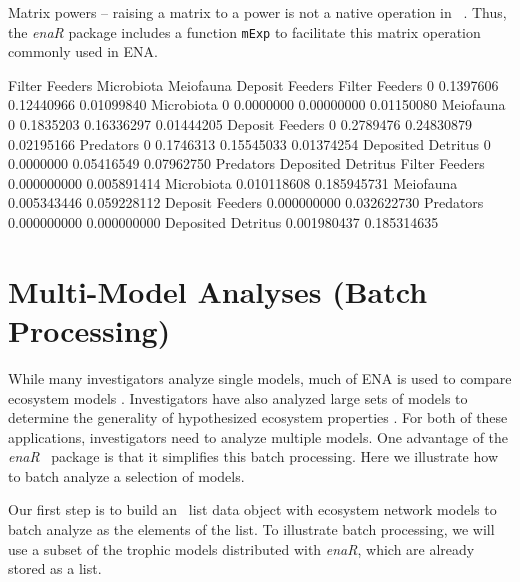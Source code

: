 \documentclass[article]{jss}
\newcommand{\R}{\proglang{R}}
\begin{document}
Matrix powers -- raising a matrix to a power is not a native operation
in \R\ .  Thus, the \textit{enaR} package includes a function
\texttt{mExp} to facilitate this matrix operation commonly used in ENA.

\begin{Schunk}
\begin{Soutput}
                   Filter Feeders Microbiota  Meiofauna Deposit Feeders
Filter Feeders                  0  0.1397606 0.12440966      0.01099840
Microbiota                      0  0.0000000 0.00000000      0.01150080
Meiofauna                       0  0.1835203 0.16336297      0.01444205
Deposit Feeders                 0  0.2789476 0.24830879      0.02195166
Predators                       0  0.1746313 0.15545033      0.01374254
Deposited Detritus              0  0.0000000 0.05416549      0.07962750
                     Predators Deposited Detritus
Filter Feeders     0.000000000        0.005891414
Microbiota         0.010118608        0.185945731
Meiofauna          0.005343446        0.059228112
Deposit Feeders    0.000000000        0.032622730
Predators          0.000000000        0.000000000
Deposited Detritus 0.001980437        0.185314635
\end{Soutput}
\end{Schunk}

\section{Multi-Model Analyses (Batch Processing)}

While many investigators analyze single models, much of ENA is used to
compare ecosystem models \cite[e.g.,][]{baird91, vanoevelen2006carbon,
christian03, niquil2012physical, hines15}.  Investigators have also
analyzed large sets of models to determine the generality of
hypothesized ecosystem properties \citep[e.g.,][]{christensen95,
borrett10_hmg, salas11_did}.  For both of these applications,
investigators need to analyze multiple models.  One advantage of the
\textit{enaR} \R\ package is that it simplifies this batch processing.
Here we illustrate how to batch analyze a selection of models.

Our first step is to build an \R\ list data object with ecosystem
network models to batch analyze as the elements of the list.  To
illustrate batch processing, we will use a subset of the trophic models
distributed with \textit{enaR}, which are already stored as a list.
\end{document}
